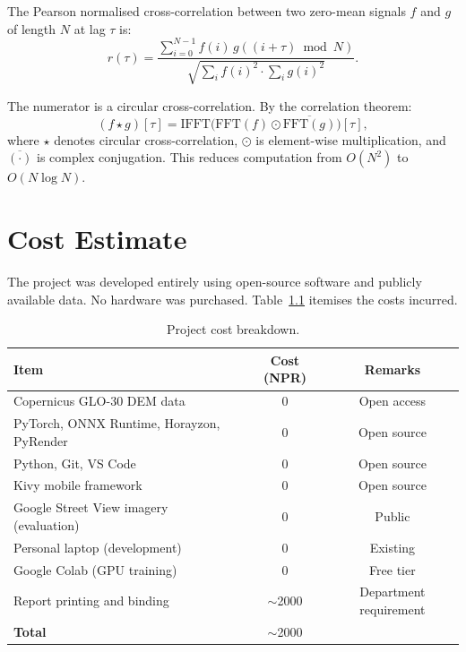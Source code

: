 The Pearson normalised cross-correlation between two zero-mean signals $f$ and $g$ of length $N$ at lag $\tau$ is:
\begin{equation}
r(\tau) = \frac{\sum_{i=0}^{N-1} f(i) \, g((i + \tau) \bmod N)}{\sqrt{\sum_i f(i)^2 \cdot \sum_i g(i)^2}}.
\end{equation}

\noindent The numerator is a circular cross-correlation. By the correlation theorem:
\begin{equation}
(f \star g)[\tau] = \mathrm{IFFT}\!\big(\mathrm{FFT}(f) \odot \overline{\mathrm{FFT}(g)}\big)[\tau],
\end{equation}
\noindent where $\star$ denotes circular cross-correlation, $\odot$ is element-wise multiplication, and $\overline{(\cdot)}$ is complex conjugation. This reduces computation from $O(N^2)$ to $O(N \log N)$.

\chapter{Cost Estimate}
\label{app:budget}

The project was developed entirely using open-source software and publicly available data. No hardware was purchased. Table~\ref{tab:budget} itemises the costs incurred.

\begin{table}[H]
\centering
\small
\caption{Project cost breakdown.}
\label{tab:budget}
\begin{tabular}{p{6cm}cc}
\toprule
\textbf{Item} & \textbf{Cost (NPR)} & \textbf{Remarks} \\
\midrule
Copernicus GLO-30 DEM data & 0 & Open access \\
PyTorch, ONNX Runtime, Horayzon, PyRender & 0 & Open source \\
Python, Git, VS Code & 0 & Open source \\
Kivy mobile framework & 0 & Open source \\
Google Street View imagery (evaluation) & 0 & Public \\
Personal laptop (development) & 0 & Existing \\
Google Colab (GPU training) & 0 & Free tier \\
Report printing and binding & $\sim$2000 & Department requirement \\
\midrule
\textbf{Total} & $\sim$2000 & \\
\bottomrule
\end{tabular}
\end{table}


